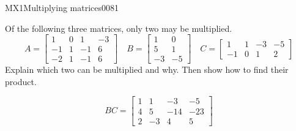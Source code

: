 \begin{exercise}{MX1}{Multiplying matrices}{0081} 
\begin{exerciseStatement} 

Of the following three matrices, only two may be multiplied. \[
          A=\left[\begin{array}{cccc}
1 & 0 & 1 & -3 \\
-1 & 1 & -1 & 6 \\
-2 & 1 & -1 & 6
\end{array}\right] \hspace{1em} B=\left[\begin{array}{cc}
1 & 0 \\
5 & 1 \\
-3 & -5
\end{array}\right] \hspace{1em} C=\left[\begin{array}{cccc}
1 & 1 & -3 & -5 \\
-1 & 0 & 1 & 2
\end{array}\right]
      \] Explain which two can be multiplied and why. Then show how to find their product.

 \end{exerciseStatement}
 \begin{exerciseAnswer} \[BC=\left[\begin{array}{cccc}
1 & 1 & -3 & -5 \\
4 & 5 & -14 & -23 \\
2 & -3 & 4 & 5
\end{array}\right]\] \end{exerciseAnswer}
 \end{exercise}




